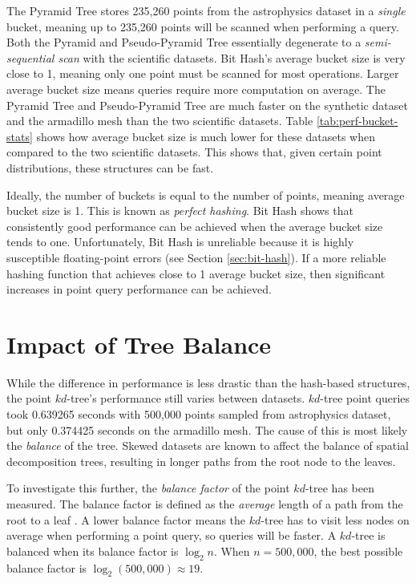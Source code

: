 The Pyramid Tree stores 235,260 points from the astrophysics dataset in a \textit{single} bucket, meaning up to 235,260 points will be scanned when performing a query. Both the Pyramid and Pseudo-Pyramid Tree essentially degenerate to a \textit{semi-sequential scan} with the scientific datasets. Bit Hash's average bucket size is very close to 1, meaning only one point must be scanned for most operations. Larger average bucket size means queries require more computation on average. The Pyramid Tree and Pseudo-Pyramid Tree are much faster on the synthetic dataset and the armadillo mesh than the two scientific datasets. Table \ref{tab:perf-bucket-stats} shows how average bucket size is much lower for these datasets when compared to the two scientific datasets. This shows that, given certain point distributions, these structures can be fast.

Ideally, the number of buckets is equal to the number of points, meaning average bucket size is 1. This is known as \textit{perfect hashing}. Bit Hash shows that consistently good performance can be achieved when the average bucket size tends to one. Unfortunately, Bit Hash is unreliable because it is highly susceptible floating-point errors (see Section \ref{sec:bit-hash}). If a more reliable hashing function that achieves close to 1 average bucket size, then significant increases in point query performance can be achieved.

\section{Impact of Tree Balance}

While the difference in performance is less drastic than the hash-based structures, the point $kd$-tree's performance still varies between datasets. $kd$-tree point queries took 0.639265 seconds with 500,000 points sampled from astrophysics dataset, but only 0.374425 seconds on the armadillo mesh. The cause of this is most likely the \textit{balance} of the tree. Skewed datasets are known to affect the balance of spatial decomposition trees, resulting in longer paths from the root node to the leaves.

To investigate this further, the \textit{balance factor} of the point $kd$-tree has been measured. The balance factor is defined as the \textit{average} length of a path from the root to a leaf \cite{kdtree-v-bdtree}. A lower balance factor means the $kd$-tree has to visit less nodes on average when performing a point query, so queries will be faster. A $kd$-tree is balanced when its balance factor is $\log_2 n$. When $n = 500,000$, the best possible balance factor is $\log_2 (500,000) \approx 19$.

